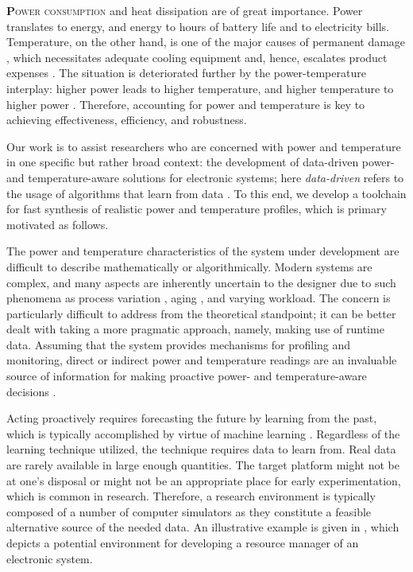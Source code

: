 \lettrine[findent=0.3em, nindent=0em]{\textbf{P}}{ower consumption} and heat
dissipation are of great importance. Power translates to energy, and energy to
hours of battery life and to electricity bills. Temperature, on the other hand,
is one of the major causes of permanent damage \cite{jedec}, which necessitates
adequate cooling equipment and, hence, escalates product expenses
\cite{chaudhry2015}. The situation is deteriorated further by the
power-temperature interplay: higher power leads to higher temperature, and
higher temperature to higher power \cite{liu2007}. Therefore, accounting for
power and temperature is key to achieving effectiveness, efficiency, and
robustness.

Our work is to assist researchers who are concerned with power and temperature
in one specific but rather broad context: the development of data-driven power-
and temperature-aware solutions for electronic systems; here \emph{data-driven}
refers to the usage of algorithms that learn from data \cite{bishop2006}. To
this end, we develop a toolchain for fast synthesis of realistic power and
temperature profiles, which is primary motivated as follows.

The power and temperature characteristics of the system under development are
difficult to describe mathematically or algorithmically. Modern systems are
complex, and many aspects are inherently uncertain to the designer due to such
phenomena as process variation \cite{chandrakasan2000}, aging \cite{coskun2006},
and varying workload. The concern is particularly difficult to address from the
theoretical standpoint; it can be better dealt with taking a more pragmatic
approach, namely, making use of runtime data. Assuming that the system provides
mechanisms for profiling and monitoring, direct or indirect power and
temperature readings are an invaluable source of information for making
proactive power- and temperature-aware decisions \cite{chaudhry2015,
coskun2008}.


Acting proactively requires forecasting the future by learning from the past,
which is typically accomplished by virtue of machine learning \cite{bishop2006}.
Regardless of the learning technique utilized, the technique requires data to
learn from. Real data are rarely available in large enough quantities. The
target platform might not be at one's disposal or might not be an appropriate
place for early experimentation, which is common in research. Therefore, a
research environment is typically composed of a number of computer simulators as
they constitute a feasible alternative source of the needed data. An
illustrative example is given in , which depicts a potential
environment for developing a resource manager of an electronic system.

